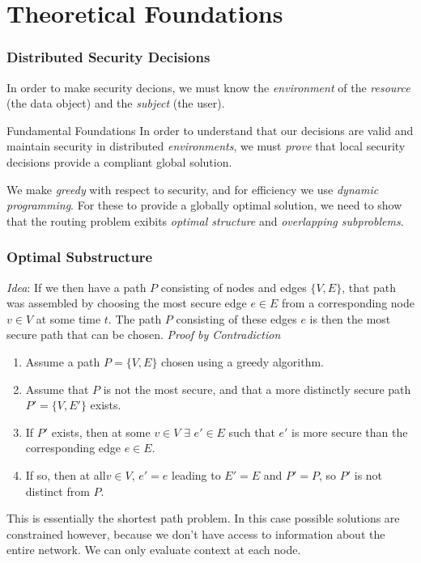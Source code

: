\documentclass[t,handout, 10pt]{beamer}
\begin{document}
\section{Theoretical Foundations}
\begin{frame}
\frametitle{Distributed Security Decisions}
In order to make security decions, we must know the {\it environment} of the {\it resource} (the data object) and the {\it subject} (the user).
\pause
\newline
\newline
\newline
\begin{beamerboxesrounded}[shadow]{Fundamental Foundations}
In order to understand that our decisions are valid and maintain security in distributed {\it environments}, we must {\it prove} that local security decisions provide a compliant global solution. 
\end{beamerboxesrounded}
\pause
\newline
\newline
\newline
We make {\it greedy} with respect to security, and for efficiency we use {\it dynamic programming}.  For these to provide a globally optimal solution, we need to show that the routing problem exibits {\it optimal structure} and {\it overlapping subproblems}.
\end{frame}

\begin{frame}
\frametitle{Optimal Substructure}
{\it Idea}: If we then have a path $P$ consisting of nodes and edges $\lbrace V, E \rbrace$, that path was assembled by choosing the most secure edge $e \in E$ from a corresponding node $v \in V$ at some time $t$.  The path $P$ consisting of these edges $e$ is then the most secure path that can be chosen.
\pause
\newline
\newline
{\it Proof by Contradiction}
{\small
\begin{enumerate}
\item Assume a path $P = \lbrace V, E \rbrace$ chosen using a greedy algorithm.
\item Assume that $P$ is not the most secure, and that a more distinctly secure path $P' = \lbrace V, E' \rbrace$ exists.
\item If $P'$ exists, then at some $v \in V$ $\exists$ $e' \in E$ such that $e'$ is more secure than the corresponding edge $e \in E$.
\item If so, then at all$v \in V$, $e' = e$ leading to $E' = E$ and $P' = P$, so $P'$ is not distinct from $P$. 
\end{enumerate}
}
\pause
\color{blue}
{\small
This is essentially the shortest path problem.  In this case possible solutions are constrained however, because we don't have access to information about the entire network.  We can only evaluate context at each node.
}
\color{black}
\end{frame}
\end{document}
